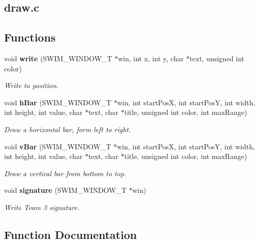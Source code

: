 \subsection{draw.c}
\subsection*{\-Functions}
\begin{DoxyCompactItemize}
\item 
void {\bf write} (\-S\-W\-I\-M\-\_\-\-W\-I\-N\-D\-O\-W\-\_\-\-T $\ast$win, int x, int y, char $\ast$text, unsigned int color)
\begin{DoxyCompactList}\small\item\em \-Write to position. \end{DoxyCompactList}\item 
void {\bf h\-Bar} (\-S\-W\-I\-M\-\_\-\-W\-I\-N\-D\-O\-W\-\_\-\-T $\ast$win, int start\-Pos\-X, int start\-Pos\-Y, int width, int height, int value, char $\ast$text, char $\ast$title, unsigned int color, int max\-Range)
\begin{DoxyCompactList}\small\item\em \-Draw a horizontal bar, form left to right. \end{DoxyCompactList}\item 
void {\bf v\-Bar} (\-S\-W\-I\-M\-\_\-\-W\-I\-N\-D\-O\-W\-\_\-\-T $\ast$win, int start\-Pos\-X, int start\-Pos\-Y, int width, int height, int value, char $\ast$text, char $\ast$title, unsigned int color, int max\-Range)
\begin{DoxyCompactList}\small\item\em \-Draw a vertical bar from bottom to top. \end{DoxyCompactList}\item 
void {\bf signature} (\-S\-W\-I\-M\-\_\-\-W\-I\-N\-D\-O\-W\-\_\-\-T $\ast$win)
\begin{DoxyCompactList}\small\item\em \-Write \-Team 3 signature. \end{DoxyCompactList}\end{DoxyCompactItemize}


\subsection{\-Function \-Documentation}
